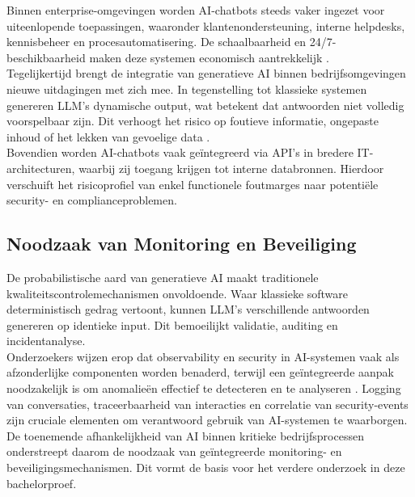 Binnen enterprise-omgevingen worden AI-chatbots steeds vaker ingezet voor uiteenlopende toepassingen, waaronder klantenondersteuning, interne helpdesks, kennisbeheer en procesautomatisering. De schaalbaarheid en 24/7-beschikbaarheid maken deze systemen economisch aantrekkelijk \autocite{dwivedi2023opinion}.\\

Tegelijkertijd brengt de integratie van generatieve AI binnen bedrijfsomgevingen nieuwe uitdagingen met zich mee. In tegenstelling tot klassieke systemen genereren LLM’s dynamische output, wat betekent dat antwoorden niet volledig voorspelbaar zijn. Dit verhoogt het risico op foutieve informatie, ongepaste inhoud of het lekken van gevoelige data \autocite{bommasani2021opportunities}.\\

Bovendien worden AI-chatbots vaak geïntegreerd via API’s in bredere IT-architecturen, waarbij zij toegang krijgen tot interne databronnen. Hierdoor verschuift het risicoprofiel van enkel functionele foutmarges naar potentiële security- en complianceproblemen. \\

\subsection{Noodzaak van Monitoring en Beveiliging}

De probabilistische aard van generatieve AI maakt traditionele kwaliteitscontrolemechanismen onvoldoende. Waar klassieke software deterministisch gedrag vertoont, kunnen LLM’s verschillende antwoorden genereren op identieke input. Dit bemoeilijkt validatie, auditing en incidentanalyse. \\

Onderzoekers wijzen erop dat observability en security in AI-systemen vaak als afzonderlijke componenten worden benaderd, terwijl een geïntegreerde aanpak noodzakelijk is om anomalieën effectief te detecteren en te analyseren \autocite{bommasani2021opportunities}. Logging van conversaties, traceerbaarheid van interacties en correlatie van security-events zijn cruciale elementen om verantwoord gebruik van AI-systemen te waarborgen. \\

De toenemende afhankelijkheid van AI binnen kritieke bedrijfsprocessen onderstreept daarom de noodzaak van geïntegreerde monitoring- en beveiligingsmechanismen. Dit vormt de basis voor het verdere onderzoek in deze bachelorproef.\\


